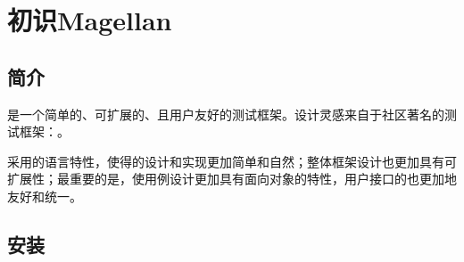 \begin{savequote}[45mm]
\end{savequote}

\chapter{初识Magellan} 
\label{ch:introduction}

\section{简介}

\begin{content}

是一个简单的、可扩展的、且用户友好的测试框架。设计灵感来自于社区著名的测试框架：。

采用的语言特性，使得的设计和实现更加简单和自然；整体框架设计也更加具有可扩展性；最重要的是，使用例设计更加具有面向对象的特性，用户接口的也更加地友好和统一。

\end{content}

\section{安装}

